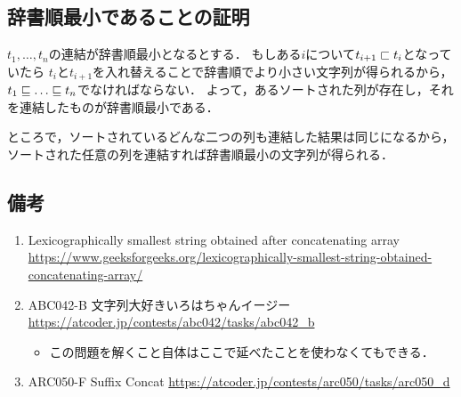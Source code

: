 \documentclass{scrartcl}
\theoremstyle{definition}
\begin{document}
\subsection{辞書順最小であることの証明}

$t_1, \dots, t_n$の連結が辞書順最小となるとする．
もしある$i$について$t_{i+1} \sqsubset t_i$となっていたら
$t_i$と$t_{i+1}$を入れ替えることで辞書順でより小さい文字列が得られるから，
$t_1 \cle \dots \cle t_n$でなければならない．
よって，あるソートされた列が存在し，それを連結したものが辞書順最小である．

ところで，ソートされているどんな二つの列も連結した結果は同じになるから，
ソートされた任意の列を連結すれば辞書順最小の文字列が得られる．


\subsection*{備考}

\begin{enumerate}
\item
  Lexicographically smallest string obtained after concatenating array
  \url{https://www.geeksforgeeks.org/lexicographically-smallest-string-obtained-concatenating-array/}
\item
  ABC042-B 文字列大好きいろはちゃんイージー \url{https://atcoder.jp/contests/abc042/tasks/abc042_b}
  \begin{itemize}
  \item この問題を解くこと自体はここで延べたことを使わなくてもできる．
  \end{itemize}
\item
  ARC050-F Suffix Concat \url{https://atcoder.jp/contests/arc050/tasks/arc050_d}
\end{enumerate}
\end{document}
